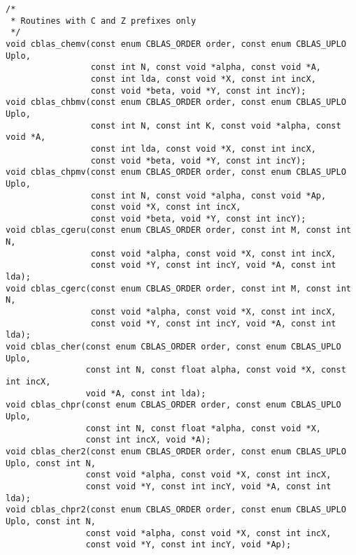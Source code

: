 \documentclass{article}
\begin{document}
\begin{Verbatim}[fontsize=\small,fontfamily=tt,fontshape=rm]
/* 
 * Routines with C and Z prefixes only
 */
void cblas_chemv(const enum CBLAS_ORDER order, const enum CBLAS_UPLO Uplo,
                 const int N, const void *alpha, const void *A,
                 const int lda, const void *X, const int incX,
                 const void *beta, void *Y, const int incY);
void cblas_chbmv(const enum CBLAS_ORDER order, const enum CBLAS_UPLO Uplo,
                 const int N, const int K, const void *alpha, const void *A,
                 const int lda, const void *X, const int incX,
                 const void *beta, void *Y, const int incY);
void cblas_chpmv(const enum CBLAS_ORDER order, const enum CBLAS_UPLO Uplo,
                 const int N, const void *alpha, const void *Ap,
                 const void *X, const int incX,
                 const void *beta, void *Y, const int incY);
void cblas_cgeru(const enum CBLAS_ORDER order, const int M, const int N,
                 const void *alpha, const void *X, const int incX,
                 const void *Y, const int incY, void *A, const int lda);
void cblas_cgerc(const enum CBLAS_ORDER order, const int M, const int N,
                 const void *alpha, const void *X, const int incX,
                 const void *Y, const int incY, void *A, const int lda);
void cblas_cher(const enum CBLAS_ORDER order, const enum CBLAS_UPLO Uplo,
                const int N, const float alpha, const void *X, const int incX,
                void *A, const int lda);
void cblas_chpr(const enum CBLAS_ORDER order, const enum CBLAS_UPLO Uplo,
                const int N, const float *alpha, const void *X,
                const int incX, void *A);
void cblas_cher2(const enum CBLAS_ORDER order, const enum CBLAS_UPLO Uplo, const int N,
                const void *alpha, const void *X, const int incX,
                const void *Y, const int incY, void *A, const int lda);
void cblas_chpr2(const enum CBLAS_ORDER order, const enum CBLAS_UPLO Uplo, const int N,
                const void *alpha, const void *X, const int incX,
                const void *Y, const int incY, void *Ap);


\end{Verbatim}
\end{document}
